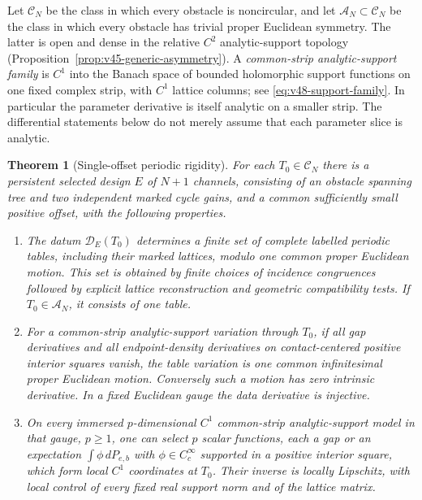 Let $\mathscr C_N$ be the class in which every obstacle is noncircular,
and let $\mathscr A_N\subset\mathscr C_N$ be the class in which every
obstacle has trivial proper Euclidean symmetry.  The latter is open and
dense in the relative $C^2$ analytic-support topology
(Proposition~\ref{prop:v45-generic-asymmetry}).  A
\emph{common-strip analytic-support family} is $C^1$ into the Banach space
of bounded holomorphic support functions on one fixed complex strip,
with $C^1$ lattice columns; see \eqref{eq:v48-support-family}.
In particular the parameter derivative is itself analytic on a smaller
strip.  The differential statements below do not merely assume that
each parameter slice is analytic.

\theoremstyle{plain}
\newtheorem{structuraltheorem}{Theorem}
\renewcommand{\thestructuraltheorem}{\Alph{structuraltheorem}}
\begin{structuraltheorem}[Single-offset periodic rigidity]
\label{thm:v48-main}
For each $T_0\in\mathscr C_N$ there is a persistent selected design
$E$ of $N+1$ channels, consisting of an obstacle spanning tree and two
independent marked cycle gains, and a common sufficiently small positive
offset, with the following properties.
\begin{enumerate}
\item The datum $\mathcal D_E(T_0)$ determines a finite set of complete
labelled periodic tables, including their marked lattices, modulo one
common proper Euclidean motion.  This set is obtained by finite choices
of incidence congruences followed by explicit lattice reconstruction
and geometric compatibility tests.  If $T_0\in\mathscr A_N$, it
consists of one table.
\item For a common-strip analytic-support variation through $T_0$, if
all gap derivatives and all endpoint-density derivatives on
contact-centered positive interior squares vanish, the table variation
is one common infinitesimal proper Euclidean motion.  Conversely such
a motion has zero intrinsic derivative.  In a fixed Euclidean gauge
the data derivative is injective.
\item On every immersed $p$-dimensional $C^1$ common-strip
analytic-support model in that gauge, $p\ge1$, one can select $p$
scalar functions, each a gap or an expectation
$\int\phi\,dP_{e,b}$ with $\phi\in C_c^\infty$ supported in a positive
interior square, which form local $C^1$ coordinates at $T_0$.
Their inverse is locally Lipschitz, with local control of every fixed
real support norm and of the lattice matrix.
\end{enumerate}
\end{structuraltheorem}

